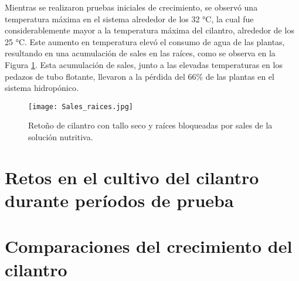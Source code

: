 Mientras se realizaron pruebas iniciales de crecimiento, se observó una temperatura máxima en el sistema alrededor de los 32 °C, la cual fue considerablemente mayor a la temperatura máxima del cilantro, alrededor de los 25 °C. Este aumento en temperatura elevó el consumo de agua de las plantas, resultando en una acumulación de sales en las raíces, como se observa en la Figura \ref{fig:raices}. Esta acumulación de sales, junto a las elevadas temperaturas en los pedazos de tubo flotante, llevaron a la pérdida del 66\% de las plantas en el sistema hidropónico.

\begin{figure}[H]
	\centering
	\texttt{[image: Sales\_raices.jpg]}
	\caption{Retoño de cilantro con tallo seco y raíces bloqueadas por sales de la solución nutritiva.}
	\label{fig:raices}
\end{figure}

\section{Retos en el cultivo del cilantro durante períodos de prueba}	%

\section{Comparaciones del crecimiento del cilantro}	%


